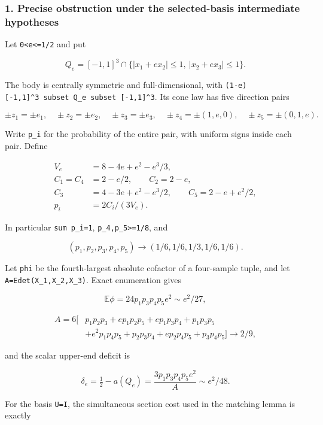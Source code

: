 \documentclass[
  11pt,
]{article}
\begin{document}
\subsubsection{1. Precise obstruction under the selected-basis
intermediate
hypotheses}\label{precise-obstruction-under-the-selected-basis-intermediate-hypotheses}

Let \texttt{0\textless{}e\textless{}=1/2} and put

\[
 Q_e=[-1,1]^3\cap\{|x_1+e x_2|\le1,\ |x_2+e x_3|\le1\}.
 \tag{1.1}
\]

The body is centrally symmetric and full-dimensional, with
\texttt{(1-e){[}-1,1{]}\^{}3\ subset\ Q\_e\ subset\ {[}-1,1{]}\^{}3}.
Its cone law has five direction pairs

\[
 \pm z_1=\pm e_1,\quad \pm z_2=\pm e_2,\quad \pm z_3=\pm e_3,
 \quad \pm z_4=\pm(1,e,0),\quad \pm z_5=\pm(0,1,e).
 \tag{1.2}
\]

Write \texttt{p\_i} for the probability of the entire pair, with uniform
signs inside each pair. Define

\[
\begin{aligned}
 V_e&=8-4e+e^2-e^3/3,\\
 C_1=C_4&=2-e/2,\qquad C_2=2-e,\\
 C_3&=4-3e+e^2-e^3/2,\qquad C_5=2-e+e^2/2,\\
 p_i&=2C_i/(3V_e).
\end{aligned} \tag{1.3}
\]

In particular \texttt{sum\ p\_i=1},
\texttt{p\_4,p\_5\textgreater{}=1/8}, and

\[
 (p_1,p_2,p_3,p_4,p_5)\longrightarrow(1/6,1/6,1/3,1/6,1/6).
 \tag{1.4}
\]

Let \texttt{phi} be the fourth-largest absolute cofactor of a
four-sample tuple, and let
\texttt{A=E\textbar{}det(X\_1,X\_2,X\_3)\textbar{}}. Exact enumeration
gives

\[
 \mathbb E\phi=24p_1p_3p_4p_5e^2\sim e^2/27,
 \tag{1.5}
\]

\[
\begin{aligned}
 A=6[&p_1p_2p_3+e p_1p_2p_5+e p_1p_3p_4+p_1p_3p_5\\
     &+e^2p_1p_4p_5+p_2p_3p_4+e p_2p_4p_5+p_3p_4p_5]
      \longrightarrow2/9,
\end{aligned}\tag{1.6}
\]

and the scalar upper-end deficit is

\[
 \delta_e=\tfrac12-a(Q_e)
     =\frac{3p_1p_3p_4p_5e^2}{A}\sim e^2/48.
 \tag{1.7}
\]

For the basis \texttt{U=I}, the simultaneous section cost used in the
matching lemma is exactly
\end{document}
